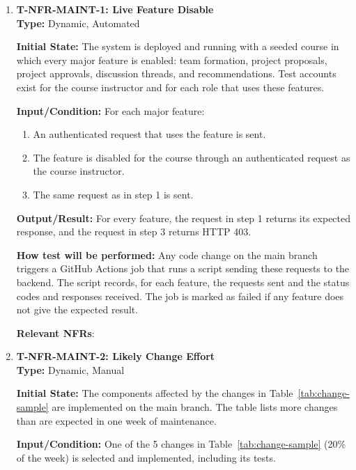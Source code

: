 \documentclass[12pt, titlepage]{article}
\providecommand{\descriptiveid}[1]{\texttt{\detokenize{#1}}}
\providecommand{\nfrref}[1]{\descriptiveid{#1}}
\newcommand{\maintFrac}{20\%}
\newcommand{\changeSampleSize}{5}
\begin{document}
\begin{enumerate}

\item \label{T-NFR-MAINT-1}\textbf{T-NFR-MAINT-1: Live Feature Disable}\\

\textbf{Type:} Dynamic, Automated

\textbf{Initial State:} The system is deployed and running with a seeded course
in which every major feature is enabled: team formation, project proposals,
project approvals, discussion threads, and recommendations. Test accounts exist
for the course instructor and for each role that uses these features.

\textbf{Input/Condition:} For each major feature:
\begin{enumerate}
  \item An authenticated request that uses the feature is sent.
  \item The feature is disabled for the course through an authenticated request
  as the course instructor.
  \item The same request as in step 1 is sent.
\end{enumerate}

\textbf{Output/Result:} For every feature, the request in step 1 returns its
expected response, and the request in step 3 returns HTTP 403.

\textbf{How test will be performed:} Any code change on the main branch
triggers a GitHub Actions job that runs a script sending these requests to the
backend. The script records, for each feature, the requests sent and the status codes and responses received. The job is marked
as failed if any feature does not give the expected result.

\textbf{Relevant NFRs}: \nfrref{NFR_LiveDisable}

\item \label{T-NFR-MAINT-2}\textbf{T-NFR-MAINT-2: Likely Change Effort}\\

\textbf{Type:} Dynamic, Manual

\textbf{Initial State:} The components affected by the changes in
Table~\ref{tab:change-sample} are implemented on the main branch. The table
lists more changes than are expected in one week of maintenance.

\textbf{Input/Condition:} One of the \changeSampleSize{} changes in
Table~\ref{tab:change-sample} (\maintFrac{} of the week) is selected and implemented,
including its tests.


\end{enumerate}
\end{document}
